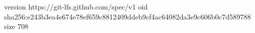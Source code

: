 version https://git-lfs.github.com/spec/v1
oid sha256:e243b3ea4e674e78ef659c8812409ddeb9cf4ac64082da3e9c606b0c7d589788
size 708
